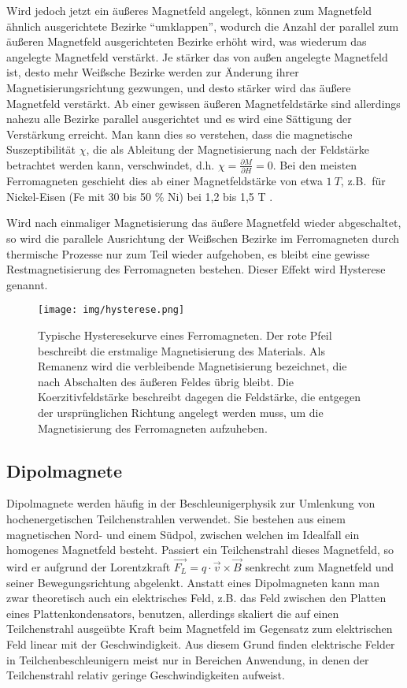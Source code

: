 \documentclass[bigchapter,colorback,accentcolor=tud4b,linedtoc,11pt]{tudreport}
\begin{document}
Wird jedoch jetzt ein äußeres Magnetfeld angelegt, können zum Magnetfeld ähnlich ausgerichtete Bezirke "`umklappen"', wodurch die Anzahl der parallel zum äußeren Magnetfeld ausgerichteten Bezirke erhöht wird, was wiederum das angelegte Magnetfeld verstärkt. Je stärker das von außen angelegte Magnetfeld ist, desto mehr Weißsche Bezirke werden zur Änderung ihrer Magnetisierungsrichtung gezwungen, und desto stärker wird das äußere Magnetfeld verstärkt. Ab einer gewissen äußeren Magnetfeldstärke sind allerdings nahezu alle Bezirke parallel ausgerichtet und es wird eine Sättigung der Verstärkung erreicht. Man kann dies so verstehen, dass die magnetische Suszeptibilität $\chi$, die als Ableitung der Magnetisierung nach der Feldstärke betrachtet werden kann, verschwindet, d.h. $\chi = \frac{\partial M}{\partial H} = 0$. Bei den meisten Ferromagneten geschieht dies ab einer Magnetfeldstärke von etwa $1~T$, z.B.\ für Nickel-Eisen (Fe mit 30 bis 50 \% Ni) bei 1,2 bis 1,5 T \cite{wiki}.

Wird nach einmaliger Magnetisierung das äußere Magnetfeld wieder abgeschaltet, so wird die parallele Ausrichtung der Weißschen Bezirke im Ferromagneten durch thermische Prozesse nur zum Teil wieder aufgehoben, es bleibt eine gewisse Restmagnetisierung des Ferromagneten bestehen. Dieser Effekt wird Hysterese genannt.

\begin{figure}[H]
\centering
\texttt{[image: img/hysterese.png]}
\caption{Typische Hysteresekurve eines Ferromagneten. Der rote Pfeil beschreibt die erstmalige Magnetisierung des Materials. Als Remanenz wird die verbleibende Magnetisierung bezeichnet, die nach Abschalten des äußeren Feldes übrig bleibt. Die Koerzitivfeldstärke beschreibt dagegen die Feldstärke, die entgegen der ursprünglichen Richtung angelegt werden muss, um die Magnetisierung des Ferromagneten aufzuheben\cite{hysterese}.}
\end{figure}

\subsection{Dipolmagnete}

Dipolmagnete werden häufig in der Beschleunigerphysik zur Umlenkung von hochenergetischen Teilchenstrahlen verwendet. Sie bestehen aus einem magnetischen Nord- und einem Südpol, zwischen welchen im Idealfall ein homogenes Magnetfeld besteht. Passiert ein Teilchenstrahl dieses Magnetfeld, so wird er aufgrund der Lorentzkraft $\vec{F_L} = q \cdot \vec{v} \times \vec{B}$ senkrecht zum Magnetfeld und seiner Bewegungsrichtung abgelenkt. Anstatt eines Dipolmagneten kann man zwar theoretisch auch ein elektrisches Feld, z.B. das Feld zwischen den Platten eines Plattenkondensators, benutzen, allerdings skaliert die auf einen Teilchenstrahl ausgeübte Kraft beim Magnetfeld im Gegensatz zum elektrischen Feld linear mit der Geschwindigkeit. Aus diesem Grund finden elektrische Felder in Teilchenbeschleunigern meist nur in Bereichen Anwendung, in denen der Teilchenstrahl relativ geringe Geschwindigkeiten aufweist.
\end{document}
